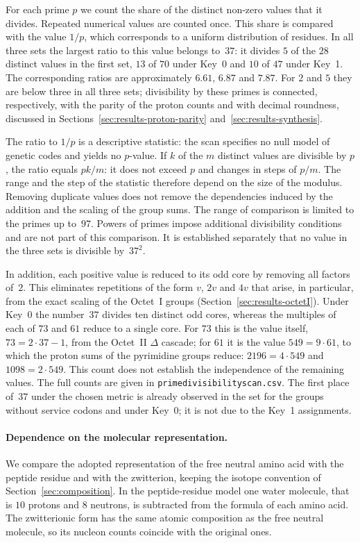 \documentclass[11pt,a4paper]{article}
\renewcommand{\_}{\origunderscore\allowbreak}
\begin{document}
For each prime $p$ we count the share of the distinct non-zero
values that it divides. Repeated numerical values are counted once.
This share is compared with the value $1/p$, which corresponds to a
uniform distribution of residues. In all three sets the largest
ratio to this value belongs to~$37$: it divides $5$ of the $28$
distinct values in the first set, $13$ of $70$ under Key~0 and $10$
of $47$ under Key~1. The corresponding ratios are approximately
$6.61$, $6.87$ and $7.87$. For $2$ and $5$ they are below three in
all three sets; divisibility by these primes is connected,
respectively, with the parity of the proton counts and with decimal
roundness, discussed in Sections~\ref{sec:results-proton-parity}
and~\ref{sec:results-synthesis}.

The ratio to $1/p$ is a descriptive statistic: the scan specifies no
null model of genetic codes and yields no $p$-value. If $k$ of the $m$ distinct
values are divisible by $p$, the ratio equals $pk/m$: it does
not exceed $p$ and changes in steps of $p/m$. The range and
the step of the statistic therefore depend on the size of the
modulus. Removing duplicate values does not remove the dependencies induced by the
addition and the scaling of the group sums. The range of comparison
is limited to the primes up to~$97$. Powers of primes impose
additional divisibility conditions and are not part of this
comparison. It is established separately that no value in the three
sets is divisible by~$37^2$.

In addition, each positive value is reduced to its odd core by
removing all factors of~$2$. This eliminates repetitions of the form
$v$, $2v$ and $4v$ that arise, in particular, from the exact scaling
of the Octet~I groups (Section~\ref{sec:results-octetI}). Under
Key~0 the number~$37$ divides ten distinct odd cores, whereas the
multiples of each of $73$ and $61$ reduce to a single core. For $73$
this is the value itself, $73=2\cdot37-1$, from the Octet~II
$\Delta$ cascade; for $61$ it is the value $549=9\cdot61$, to which
the proton sums of the pyrimidine groups reduce: $2196=4\cdot549$
and $1098=2\cdot549$. This count does not establish the independence
of the remaining values. The full counts are given in
\texttt{prime\_divisibility\_scan.csv}. The first place of~$37$ under the
chosen metric is already observed in the set for the groups without
service codons and under Key~0; it is not due to the Key~1
assignments.

\paragraph{Dependence on the molecular representation.}
We compare the adopted representation of the free neutral amino acid
with the peptide residue and with the zwitterion, keeping the
isotope convention of Section~\ref{sec:composition}. In the
peptide-residue model one water molecule, that is $10$ protons and
$8$ neutrons, is subtracted from the formula of each amino acid. The
zwitterionic form has the same atomic composition as the free
neutral molecule, so its nucleon counts coincide with the original
ones.
\end{document}
